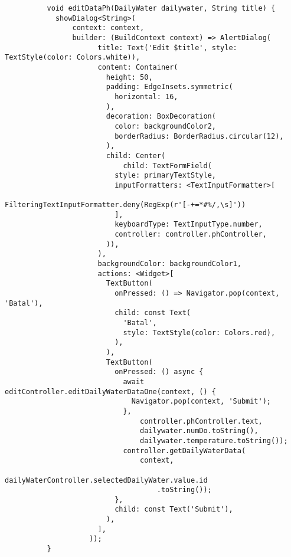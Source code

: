 \begin{lstlisting}
          void editDataPh(DailyWater dailywater, String title) {
            showDialog<String>(
                context: context,
                builder: (BuildContext context) => AlertDialog(
                      title: Text('Edit $title', style: TextStyle(color: Colors.white)),
                      content: Container(
                        height: 50,
                        padding: EdgeInsets.symmetric(
                          horizontal: 16,
                        ),
                        decoration: BoxDecoration(
                          color: backgroundColor2,
                          borderRadius: BorderRadius.circular(12),
                        ),
                        child: Center(
                            child: TextFormField(
                          style: primaryTextStyle,
                          inputFormatters: <TextInputFormatter>[
                            FilteringTextInputFormatter.deny(RegExp(r'[-+=*#%/,\s]'))
                          ],
                          keyboardType: TextInputType.number,
                          controller: controller.phController,
                        )),
                      ),
                      backgroundColor: backgroundColor1,
                      actions: <Widget>[
                        TextButton(
                          onPressed: () => Navigator.pop(context, 'Batal'),
                          child: const Text(
                            'Batal',
                            style: TextStyle(color: Colors.red),
                          ),
                        ),
                        TextButton(
                          onPressed: () async {
                            await editController.editDailyWaterDataOne(context, () {
                              Navigator.pop(context, 'Submit');
                            },
                                controller.phController.text,
                                dailywater.numDo.toString(),
                                dailywater.temperature.toString());
                            controller.getDailyWaterData(
                                context,
                                dailyWaterController.selectedDailyWater.value.id
                                    .toString());
                          },
                          child: const Text('Submit'),
                        ),
                      ],
                    ));
          }
        

\end{lstlisting}
